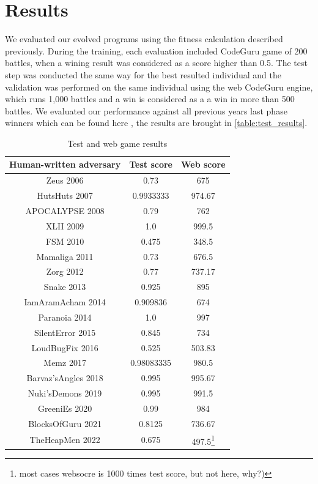 \documentclass[dvipsnames,format=sigconf,anonymous=true,review=true]{acmart}
\begin{document}
\section{Results}
We evaluated our evolved programs using the fitness calculation described previously. During the training, each evaluation included CodeGuru game of 200 battles, when a wining result was considered as a score higher than 0.5. The test step was conducted the same way for the best resulted individual and the validation was performed on the same individual using the web CodeGuru engine, which runs 1,000 battles and a win is considered as a a win in more than 500 battles. We evaluated our performance against all previous years last phase winners which can be found here \cite{codeguru_repo}, the results are brought in  \autoref{table:test_results}.

\begin{table}[!ht]
\centering
\begin{tabular}{|c|c|c|} 
\hline
\multicolumn{1}{|c|}{\textbf{Human-written adversary}} &
\multicolumn{1}{c|}{\textbf{Test score}} &
\multicolumn{1}{c|}{\textbf{Web score}} \\ [0.5ex] \hline\hline
Zeus 2006 & 0.73 & 675 \\ \hline
HutsHuts 2007 & 0.9933333 & 974.67\\ \hline
APOCALYPSE 2008 & 0.79 & 762\\ \hline
XLII 2009 & 1.0 & 999.5\\ \hline
FSM 2010 & 0.475 & 348.5\\ \hline
Mamaliga 2011 & 0.73 & 676.5\\ \hline
Zorg 2012 & 0.77 & 737.17\\ \hline
Snake 2013 & 0.925 & 895\\ \hline
IamAramAcham 2014 & 0.909836 & 674 \\ \hline
Paranoia 2014 & 1.0 & 997\\ \hline
SilentError	2015 & 0.845 & 734\\ \hline
LoudBugFix 2016 & 0.525 & 503.83 \\ \hline
Memz 2017 & 0.98083335 & 980.5\\ \hline
Barvaz'sAngles 2018 & 0.995 & 995.67\\ \hline
Nuki'sDemons 2019 &  0.995 & 991.5 \\ \hline
GreeniEs 2020 & 0.99 & 984 \\ \hline
BlocksOfGuru 2021 & 0.8125 & 736.67\\ \hline
TheHeapMen 2022 & 0.675 & 497.5\footnote{most cases websocre is 1000 times test score, but not here, why?)} \\ \hline
\end{tabular}
\caption{Test and web game results}
\label{table:test_results}
\end{table}
\end{document}
